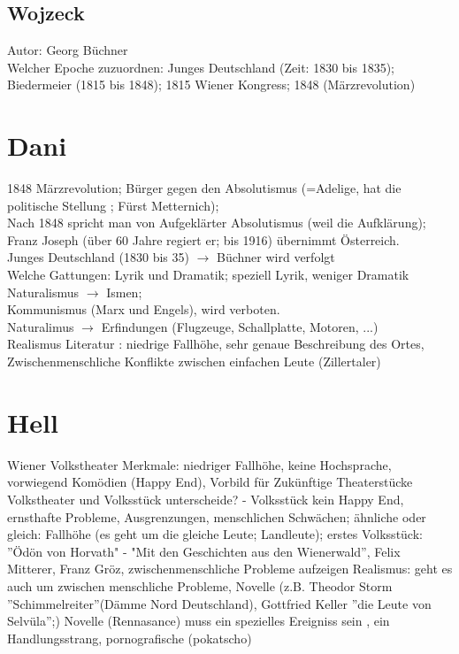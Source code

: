 \documentclass[a4paper]{article}
\begin{document}
\subsection{Wojzeck}

Autor: Georg Büchner \\
Welcher Epoche zuzuordnen: Junges Deutschland (Zeit: 1830 bis 1835); Biedermeier (1815 bis 1848); 1815 Wiener Kongress; 1848 (Märzrevolution)\\

\section{Dani}

1848 Märzrevolution; Bürger gegen den Absolutismus (=Adelige, hat die politische Stellung ; Fürst Metternich);\\
Nach 1848 spricht man von Aufgeklärter Absolutismus (weil die Aufklärung); Franz Joseph (über 60 Jahre regiert er; bis 1916) übernimmt Österreich.\\

Junges Deutschland (1830 bis 35) $\rightarrow$ Büchner wird verfolgt\\
Welche Gattungen: Lyrik und Dramatik; speziell Lyrik, weniger Dramatik\\

Naturalismus $\rightarrow$ Ismen;\\
Kommunismus (Marx und Engels), wird verboten.\\
Naturalimus $\rightarrow$ Erfindungen (Flugzeuge, Schallplatte, Motoren, ...)\\
Realismus Literatur : niedrige Fallhöhe, sehr genaue Beschreibung des Ortes, Zwischenmenschliche Konflikte zwischen einfachen Leute (Zillertaler)

\section{Hell}

Wiener Volkstheater Merkmale: niedriger Fallhöhe, keine Hochsprache, vorwiegend Komödien (Happy End), Vorbild für Zukünftige Theaterstücke
Volkstheater und Volksstück unterscheide? - Volksstück kein Happy End, ernsthafte Probleme, Ausgrenzungen, menschlichen Schwächen; ähnliche oder gleich: Fallhöhe (es geht um die gleiche Leute; Landleute); erstes Volksstück: ''Ödön von Horvath" - "Mit den Geschichten aus den Wienerwald'', Felix Mitterer, Franz Gröz, zwischenmenschliche Probleme aufzeigen
\newline
Realismus: geht es auch um zwischen menschliche Probleme, Novelle (z.B. Theodor Storm ''Schimmelreiter''(Dämme Nord Deutschland), Gottfried Keller ''die Leute von Selvüla'';) 
\newline
Novelle (Rennasance)  muss ein spezielles Ereigniss sein , ein Handlungsstrang, pornografische (pokatscho)
\end{document}

